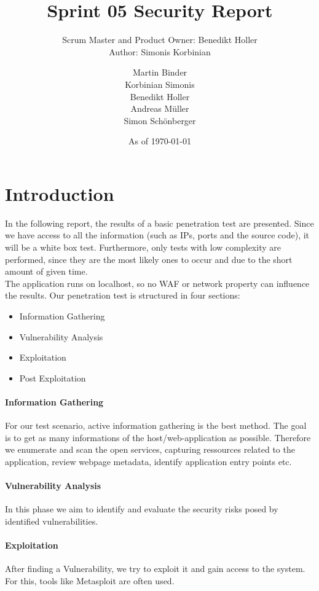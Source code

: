 \documentclass{scrreprt}
\title{Sprint 05 Security Report}
\subtitle{Scrum Master and Product Owner: Benedikt Holler \\ Author: Simonis Korbinian}
\author{Martin Binder\\Korbinian Simonis\\Benedikt Holler\\Andreas M\"uller\\Simon Sch\"onberger}
\date{As of \today}
\begin{document}
\maketitle
\section{Introduction}
\noindent In the following report, the results of a basic penetration test are presented. Since we have access to all the information (such as IPs, ports and the source code), it will be a white box test. Furthermore, only tests with low complexity are performed, since they are the most likely ones to occur and due to the short amount of given time. \\
The application runs on localhost, so no WAF or network property can influence the results.
Our penetration test is structured in four sections: \\
\begin{itemize}
	\item Information Gathering
	\item Vulnerability Analysis
	\item Exploitation
	\item Post Exploitation
\end{itemize} 

\paragraph{Information Gathering}
For our test scenario, active information gathering is the best method. The goal is to get as many informations of the host/web-application as possible. Therefore we enumerate and scan the open services, capturing ressources related to the application, review webpage metadata, identify application entry points etc. 

\paragraph{Vulnerability Analysis}
In this phase we aim to identify and evaluate the security risks posed by identified vulnerabilities.

\paragraph{Exploitation}
After finding a Vulnerability, we try to exploit it and gain access to the system. For this, tools like Metasploit are often used.
\end{document}
